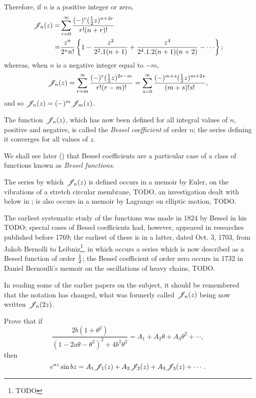 \documentclass{book}
\begin{document}
Therefore, if $n$ is a positive integer or zero, 
\begin{align*}
  \besJ_n(z) =& \sum_{r=0}^{\infty} \frac{ (-)^r (\half z)^{n+2r} }{
    r!(n+r)! } \\
  =& \frac{ z^n }{ 2^n n! } 
  \thebrace{ 1 - \frac{z^2}{2^2.1(n+1)} + \frac{z^4}{2^4.1.2(n+1)(n+2)}
    - \cdots };
\end{align*}
% 
% 
whereas, when $n$ is a negative integer equal to $-m$,
$$
\mathscr{J}_n(z)
= \sum_{r=m}^{\infty} \frac{ (-)^r (\frac{1}{2} z)^{2r-m} }{ r!(r-m)!  }
= \sum_{s=0}^{\infty} \frac{ (-)^{m+s} (\frac{1}{2} z)^{m+2s}  }{ (m+s)! s!  },
$$
and so $\mathscr{J}_n(z) = (-)^m \mathscr{J}_m(z)$.

The function $\mathscr{J}_n(z)$, which has now been defined for all integral
values of $n$, positive and negative, is called the
\emph{Bessel coefficient} of order $n$; the series defining it 
converges for all values of $z$.

We shall see later () that Bessel
coefficients are a particular case of a class of functions known as
\emph{Bessel functions}.

The series by which $\mathscr{J}_n(z)$ is defined occurs in a memoir by Euler,
on the vibrations of a stretch circular membrane, TODO, 
an investigation dealt with below in ;
is also occurs in a memoir by Lagrange on elliptic motion, TODO.

The earliest systematic study of the functions was made in 1824 by
Bessel in his TODO; special cases of Bessel coefficients had, however,
appeared in researches published before 1769; the earliest of these is
in a latter, dated Oct. 3, 1703, from Jakob Bernolli to
Leibniz\footnote{TODO}, in which occurs a series which is now
described as a Bessel function of order $\frac{1}{2}$; the Bessel
coefficient of order zero occurs in 1732 in Daniel Bernoulli's memoir
on the oscillations of heavy chains, TODO.

In reading some of the earlier papers on the subject, it should be
remembered that the notation has changed, what was formerly called
$\mathscr{J}_n(z)$ being now written $\mathscr{J}_n(2z)$.
\begin{wandwexample}
  Prove that if 
  $$
  \frac{ 2b(1+\theta^2)  }{ (1-2a\theta-\theta^2)^2 + 4b^2\theta^2  }
  =
  A_1 + A_2 \theta + A_3 \theta^2 + \cdots,
  $$
  then
  $$
  e^{az} \sin bz 
  =
  A_1 \mathscr{J}_1(z) + A_2 \mathscr{J}_2(z) + A_3 \mathscr{J}_3(z) + \cdots.
  $$
\end{wandwexample}
\end{document}
